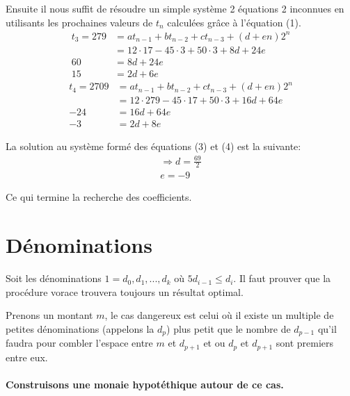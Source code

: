 \documentclass{article}
\begin{document}
Ensuite il nous suffit de résoudre un simple système 2 équations 2 inconnues en utilisants les prochaines valeurs de $t_n$ calculées grâce à l'équation (1).
\begin{equation}
  \begin{aligned}
    t_3=279 &= at_{n-1} + bt_{n-2} + ct_{n-3} + (d + en)2^n\\
    &= 12 \cdot 17 - 45 \cdot 3 + 50 \cdot 3 + 8d + 24e\\
    60 &= 8d + 24e\\
    15 &= 2d + 6e
  \end{aligned}
\end{equation}
\begin{equation}
  \begin{aligned}
    t_4=2709 &= at_{n-1} + bt_{n-2} + ct_{n-3} + (d + en)2^n\\
    &= 12 \cdot 279 - 45 \cdot 17 + 50 \cdot 3 + 16d + 64e\\
    -24 &= 16d + 64e\\
    -3 &= 2d + 8e
  \end{aligned}
\end{equation}

La solution au système formé des équations (3) et (4) est la suivante:
\begin{align*}
  \Rightarrow d = \frac{69}{2}\\
  e = -9
\end{align*}

Ce qui termine la recherche des coefficients.

\pagebreak

\section{Dénominations}

Soit les dénominations $1 = d_0, d_1, ...,d_k$ où $5d_{i-1} \leq d_i$. Il faut prouver que la procédure vorace trouvera toujours un résultat optimal.

Prenons un montant $m$, le cas dangereux est celui où il existe un multiple de petites dénominations (appelons la $d_p$) plus petit que le nombre de $d_{p-1}$ qu'il faudra pour combler l'espace entre $m$ et $d_{p+1}$ et ou $d_p$ et $d_{p+1}$ sont premiers entre eux.

\paragraph{Construisons une monaie hypotéthique autour de ce cas.}
\end{document}
